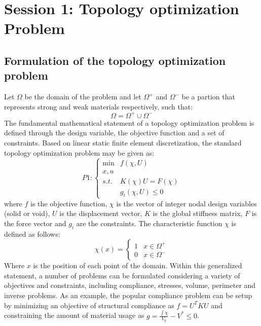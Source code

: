 \section{Session 1: Topology optimization Problem}

\subsection{Formulation of the topology optimization problem}
Let $ \Omega $ be the domain of the problem and let $\Omega^+ $ and $ \Omega^- $ be a partion that represents strong and weak materials respectively, such that:
\begin{equation}
\Omega=\Omega^+\cup\Omega^-
\end{equation}
The fundamental mathematical statement of a topology optimization
problem is defined through the design variable, the objective function and a set of constraints. Based on linear static finite element discretization, the standard topology optimization problem may be given as: 
\begin{equation}
P1:\left\{ \begin{array}{cc}
\min & f(\chi,U)\\
x, u & \\
s.t. & K(\chi)U=F(\chi)\\
 & g_{i}(\chi,U)\leq0
\end{array}\right.\label{eq:problem topology optimization}
\end{equation}
where $f$ is the objective function, $\chi$ is the vector of integer
nodal design variables (solid or void), $U$ is the displacement vector,
$K$ is the global stiffness matrix, $F$ is the force vector and
$g_{i}$ are the constraints. The characteristic function $\chi$ is defined as follows:
\begin{equation}
\chi(x)=\left\{ \begin{array}{cc}
1 & x \in \Omega^+ \\
0 & x \in \Omega^-
\end{array}\right.\label{eq:chi_def}
\end{equation}
Where $x$ is the position of each point of the domain. Within this generalized statement, a number of problems can be formulated
considering a variety of objectives and constraints, including compliance,
stresses, volume, perimeter and inverse problems. As an example, the
popular compliance problem can be setup by minimizing an objective
of structural compliance as $f=U^{T}KU$ and constraining the amount
of material usage as $g=\frac{\int \chi}{V_{0}}-V^{*}\le0$.\\\\
